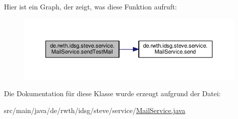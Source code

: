 Hier ist ein Graph, der zeigt, was diese Funktion aufruft\+:\nopagebreak
\begin{figure}[H]
\begin{center}
\leavevmode
\includegraphics[width=350pt]{classde_1_1rwth_1_1idsg_1_1steve_1_1service_1_1_mail_service_aaf445960dcd0526a5b60fbf254c5c3e0_cgraph}
\end{center}
\end{figure}




Die Dokumentation für diese Klasse wurde erzeugt aufgrund der Datei\+:\begin{DoxyCompactItemize}
\item 
src/main/java/de/rwth/idsg/steve/service/\hyperlink{_mail_service_8java}{Mail\+Service.\+java}\end{DoxyCompactItemize}
